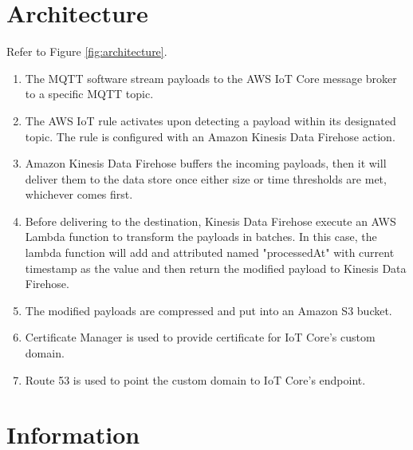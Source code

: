 \documentclass{article}
\begin{document}
\section{Architecture}\label{architecture}

Refer to Figure \ref{fig:architecture}.
\begin{enumerate}
  \item The MQTT software stream payloads to the AWS IoT Core message broker to a specific MQTT topic.
  \item The AWS IoT rule activates upon detecting a payload within its designated topic. The rule is configured with an Amazon Kinesis Data Firehose action. 
  \item Amazon Kinesis Data Firehose buffers the incoming payloads, then it will deliver them to the data store once either size or time thresholds are met, whichever comes first.
  \item Before delivering to the destination, Kinesis Data Firehose execute an AWS Lambda function to transform the payloads in batches. In this case, the lambda function will add and attributed named "processedAt" with current timestamp as the value and then return the modified payload to Kinesis Data Firehose.
  \item The modified payloads are compressed and put into an Amazon S3 bucket.
  \item Certificate Manager is used to provide certificate for IoT Core's custom domain.
  \item Route 53 is used to point the custom domain to IoT Core's endpoint.
\end{enumerate}

\section{Information}\label{information}
\end{document}
